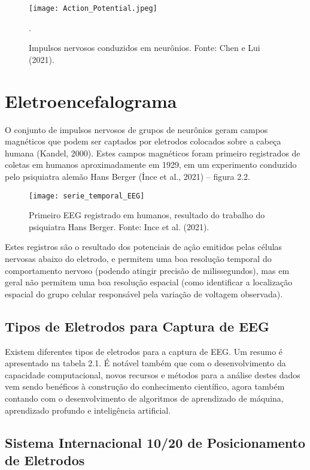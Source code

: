 \begin{figure}[h]
    \centering
    \texttt{[image: Action\_Potential.jpeg]}
    \caption[Impulsos nervosos conduzidos em neurônios]{Impulsos nervosos conduzidos em neurônios. Fonte: Chen e Lui (2021).}.\label{fig:potencial}
    \end{figure}

\section{Eletroencefalograma}
O conjunto de impulsos nervosos de grupos de neurônios geram campos magnéticos
 que podem ser captados por eletrodos colocados sobre a cabeça humana (Kandel, 2000). 
 Estes campos magnéticos foram primeiro registrados de coletas em humanos aproximadamente em 1929,
  em um experimento conduzido pelo psiquiatra alemão Hans Berger (İnce et al., 2021) – figura 2.2. 
  \begin{figure}[h]
    \centering
    \texttt{[image: serie\_temporal\_EEG]}
    \caption[]{Primeiro EEG registrado em humanos, resultado do trabalho do psiquiatra Hans Berger. Fonte: Ince et al. (2021).} 
    \end{figure}


  Estes registros são o resultado dos potenciais de ação emitidos pelas células nervosas abaixo do eletrodo, 
  e permitem uma boa resolução temporal do comportamento nervoso (podendo atingir precisão de milissegundos), 
  mas em geral não permitem uma boa resolução espacial (como identificar a localização espacial do grupo celular responsável pela variação de voltagem observada). 



  

    \subsection{Tipos de Eletrodos para Captura de EEG}

    Existem diferentes tipos de eletrodos para a captura de EEG. Um resumo é apresentado na tabela 2.1. É notável também que com o desenvolvimento da capacidade computacional, novos recursos e métodos para a análise destes dados vem sendo benéficos à construção do conhecimento científico, agora também contando com o desenvolvimento de algoritmos de aprendizado de máquina, aprendizado profundo e inteligência artificial. 
  
\subsection{Sistema Internacional 10/20 de Posicionamento de Eletrodos}

